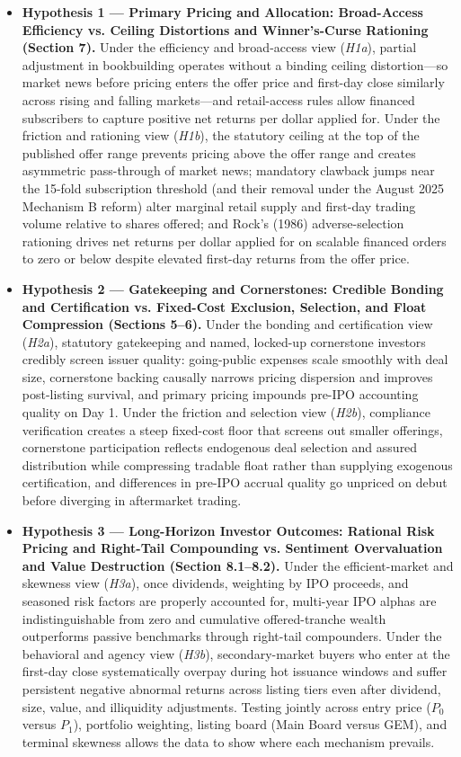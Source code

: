 \documentclass[11pt,letterpaper]{article}
\begin{document}
\begin{itemize}
\item \textbf{Hypothesis 1 — Primary Pricing and Allocation: Broad-Access Efficiency vs. Ceiling Distortions and Winner's-Curse Rationing (Section 7).} Under the efficiency and broad-access view (\textit{H1a}), partial adjustment in bookbuilding operates without a binding ceiling distortion—so market news before pricing enters the offer price and first-day close similarly across rising and falling markets—and retail-access rules allow financed subscribers to capture positive net returns per dollar applied for. Under the friction and rationing view (\textit{H1b}), the statutory ceiling at the top of the published offer range prevents pricing above the offer range and creates asymmetric pass-through of market news; mandatory clawback jumps near the 15-fold subscription threshold (and their removal under the August 2025 Mechanism B reform) alter marginal retail supply and first-day trading volume relative to shares offered; and Rock's (1986) adverse-selection rationing drives net returns per dollar applied for on scalable financed orders to zero or below despite elevated first-day returns from the offer price.
\item \textbf{Hypothesis 2 — Gatekeeping and Cornerstones: Credible Bonding and Certification vs. Fixed-Cost Exclusion, Selection, and Float Compression (Sections 5–6).} Under the bonding and certification view (\textit{H2a}), statutory gatekeeping and named, locked-up cornerstone investors credibly screen issuer quality: going-public expenses scale smoothly with deal size, cornerstone backing causally narrows pricing dispersion and improves post-listing survival, and primary pricing impounds pre-IPO accounting quality on Day 1. Under the friction and selection view (\textit{H2b}), compliance verification creates a steep fixed-cost floor that screens out smaller offerings, cornerstone participation reflects endogenous deal selection and assured distribution while compressing tradable float rather than supplying exogenous certification, and differences in pre-IPO accrual quality go unpriced on debut before diverging in aftermarket trading.
\item \textbf{Hypothesis 3 — Long-Horizon Investor Outcomes: Rational Risk Pricing and Right-Tail Compounding vs. Sentiment Overvaluation and Value Destruction (Section 8.1–8.2).} Under the efficient-market and skewness view (\textit{H3a}), once dividends, weighting by IPO proceeds, and seasoned risk factors are properly accounted for, multi-year IPO alphas are indistinguishable from zero and cumulative offered-tranche wealth outperforms passive benchmarks through right-tail compounders. Under the behavioral and agency view (\textit{H3b}), secondary-market buyers who enter at the first-day close systematically overpay during hot issuance windows and suffer persistent negative abnormal returns across listing tiers even after dividend, size, value, and illiquidity adjustments. Testing jointly across entry price ($P_0$ versus $P_1$), portfolio weighting, listing board (Main Board versus GEM), and terminal skewness allows the data to show where each mechanism prevails.

\end{itemize}
\end{document}
